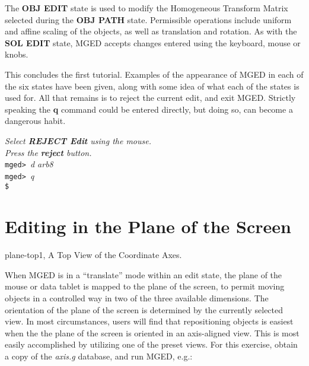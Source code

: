 The {\bf OBJ EDIT} state is used to modify the
Homogeneous Transform Matrix selected during the {\bf OBJ PATH} state.
Permissible operations include uniform and affine scaling of the objects,
as well as translation and rotation.
As with the {\bf SOL EDIT} state, MGED accepts changes entered using
the keyboard, mouse or knobs.

This concludes the first tutorial.  Examples of the appearance of MGED
in each of the six states have been given, along with some idea of what
each of the states is used for.  All that remains is to reject the current
edit, and exit MGED.  Strictly speaking the {\bf q} command could be entered
directly, but doing so, can become a dangerous habit.

\noindent
{\em Select {\bf REJECT Edit} using the mouse.}\\
{\em Press the {\bf reject} button.}\\
{\tt mged> }{\em d arb8}\\
{\tt mged> }{\em q}\\
{\tt \$ }\\

\section{Editing in the Plane of the Screen}
\mfig plane-top1, A Top View of the Coordinate Axes.

When MGED is in a ``translate'' mode within an edit state,
the plane of the mouse or data tablet is mapped to
the plane of the screen, to permit moving objects in a
controlled way in two of the three available dimensions.
The orientation of the plane of the screen is determined by the
currently selected view.
In most circumstances, users will find that repositioning objects
is easiest when the the plane of the screen is oriented in an
axis-aligned view.  This is most easily accomplished by utilizing
one of the preset views.
For this exercise, obtain a copy of the {\em axis.g} database,
and run MGED, e.g.:


